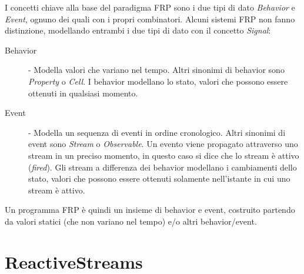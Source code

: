 \documentclass[../main.tex]{subfiles}
\begin{document}
I concetti chiave alla base del paradigma FRP sono i due tipi di dato \textit{Behavior} e \textit{Event}, ognuno dei quali con i propri combinatori. Alcuni sistemi FRP non fanno distinzione, modellando entrambi i due tipi di dato con il concetto \textit{Signal}:
\begin{description}
    \item[Behavior] - Modella valori che variano nel tempo. Altri sinonimi di behavior sono \textit{Property} o \textit{Cell}. I behavior modellano lo stato, valori che possono essere ottenuti in qualsiasi momento.
    \item[Event] - Modella un sequenza di eventi in ordine cronologico. Altri sinonimi di event sono \textit{Stream} o \textit{Observable}. Un evento viene propagato attraverso uno stream in un preciso momento, in questo caso si dice che lo stream è attivo (\textit{fired}). Gli stream a differenza dei behavior modellano i cambiamenti dello stato, valori che possono essere ottenuti solamente nell'istante in cui uno stream è attivo.
\end{description}

Un programma FRP è quindi un insieme di behavior e event, costruito partendo da valori statici (che non variano nel tempo) e/o altri behavior/event.

\section{ReactiveStreams}
\end{document}
